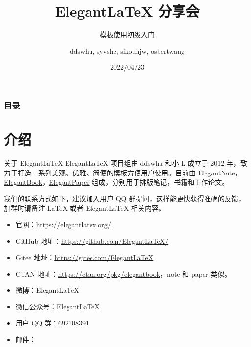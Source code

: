 \documentclass[9pt]{beamer}
\author{ddswhu, syvshc, sikouhjw, osbertwang}
\title{Elegant\LaTeX{} 分享会}
\subtitle{模板使用初级入门}
\institute{ElegantLaTeX Program}
\date{2022/04/23}
\begin{document}
\maketitle


\begin{frame}\frametitle{目录}
\tableofcontents[hideallsubsections]
\end{frame}


\section{介绍}

\begin{frame}{关于 ElegantLaTeX}
Elegant\LaTeX{} 项目组由 \textcolor{iron}{ddswhu} 和\textcolor{iron}{小 L} 成立于 2012 年，致力于打造一系列美观、优雅、简便的模板方便用户使用。目前由 \href{https://github.com/ElegantLaTeX/ElegantNote}{ElegantNote}，\href{https://github.com/ElegantLaTeX/ElegantBook}{ElegantBook}，\href{https://github.com/ElegantLaTeX/ElegantPaper}{ElegantPaper} 组成，分别用于排版笔记，书籍和工作论文。

我们的联系方式如下，建议加入用户 QQ 群提问，这样能更快获得准确的反馈，加群时请备注 \LaTeX{} 或者 Elegant\LaTeX{} 相关内容。
\begin{itemize}
  \item 官网：\href{https://elegantlatex.org/}{https://elegantlatex.org/}
  \item GitHub 地址：\href{https://github.com/ElegantLaTeX/}{https://github.com/ElegantLaTeX/}
  \item Gitee 地址：\href{https://gitee.com/ElegantLaTeX}{https://gitee.com/ElegantLaTeX}
  \item CTAN 地址：\href{https://ctan.org/pkg/elegantbook}{https://ctan.org/pkg/elegantbook}，note 和 paper 类似。
  \item 微博：Elegant\LaTeX{}
  \item 微信公众号：Elegant\LaTeX{}
  \item 用户 QQ 群：692108391
  \item 邮件：
\end{itemize}
\end{frame}
\end{document}
